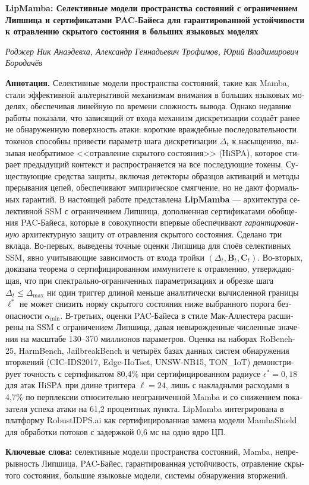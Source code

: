 \documentclass[journal,a4paper,10pt]{IEEEtran}
\theoremstyle{definition}
\theoremstyle{remark}
\begin{document}
\begin{otherlanguage}{russian}

\vspace{0.8em}
\noindent\textbf{\large LipMamba: Селективные модели пространства состояний с ограничением Липшица и сертификатами PAC-Байеса для гарантированной устойчивости к отравлению скрытого состояния в больших языковых моделях}

\vspace{0.6em}
\noindent\textit{Роджер Ник Анаэдевха, Александр Геннадьевич Трофимов, Юрий Владимирович Бородачёв}

\vspace{0.8em}
\noindent\textbf{Аннотация.} Селективные модели пространства состояний, такие как Mamba, стали эффективной альтернативой механизмам внимания в больших языковых моделях, обеспечивая линейную по времени сложность вывода. Однако недавние работы показали, что зависящий от входа механизм дискретизации создаёт ранее не обнаруженную поверхность атаки: короткие враждебные последовательности токенов способны привести параметр шага дискретизации $\Delta_t$ к насыщению, вызывая необратимое <<отравление скрытого состояния>> (HiSPA), которое стирает предыдущий контекст и распространяется на все последующие токены. Существующие средства защиты, включая детекторы образцов активаций и методы прерывания цепей, обеспечивают эмпирическое смягчение, но не дают формальных гарантий. В настоящей работе представлена \textbf{LipMamba} --- архитектура селективной SSM с ограничением Липшица, дополненная сертификатами обобщения PAC-Байеса, которые в совокупности впервые обеспечивают \emph{гарантированную} архитектурную защиту от отравления скрытого состояния. Сделано три вклада. Во-первых, выведены точные оценки Липшица для слоёв селективных SSM, явно учитывающие зависимость от входа тройки $(\Delta_t, \mathbf{B}_t, \mathbf{C}_t)$. Во-вторых, доказана теорема о сертифицированном иммунитете к отравлению, утверждающая, что при спектрально-ограниченных параметризациях и обрезке шага $\Delta_t \leq \Delta_{\max}$ ни один триггер длиной меньше аналитически вычисленной границы $\ell^*$ не может снизить норму скрытого состояния ниже выбранного порога безопасности $\alpha_{\min}$. В-третьих, оценки PAC-Байеса в стиле Мак-Аллестера расширены на SSM с ограничением Липшица, давая невырожденные численные значения на масштабе 130--370 миллионов параметров. Оценка на наборах RoBench-25, HarmBench, JailbreakBench и четырёх базах данных систем обнаружения вторжений (CIC-IDS2017, Edge-IIoTset, UNSW-NB15, TON\_IoT) демонстрирует точность с сертификатом 80,4\% при сертифицированном радиусе $\epsilon^* = 0{,}18$ для атак HiSPA при длине триггера $\ell = 24$, лишь с накладными расходами в 4,7\% по перплексии относительно неограниченной Mamba и со снижением показателя успеха атаки на 61,2 процентных пункта. LipMamba интегрирована в платформу RobustIDPS.ai как сертифицированная замена модели MambaShield для обработки потоков с задержкой 0,6 мс на одно ядро ЦП.

\vspace{0.6em}
\noindent\textbf{Ключевые слова:} селективные модели пространства состояний, Mamba, непрерывность Липшица, PAC-Байес, гарантированная устойчивость, отравление скрытого состояния, большие языковые модели, системы обнаружения вторжений.

\end{otherlanguage}
\end{document}
